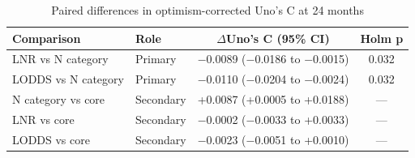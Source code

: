 \begin{table}[htbp]
\caption{Paired differences in optimism-corrected Uno's C at 24 months}\label{tab:paired}
\footnotesize
\begin{tabular*}{\textwidth}{@{\extracolsep{\fill}}llcc@{}}
\toprule
Comparison & Role & $\Delta$Uno's C (95\% CI) & Holm p \\
\midrule
LNR vs N category & Primary & $-$0.0089 ($-$0.0186 to $-$0.0015) & 0.032 \\
LODDS vs N category & Primary & $-$0.0110 ($-$0.0204 to $-$0.0024) & 0.032 \\
N category vs core & Secondary & +0.0087 (+0.0005 to +0.0188) & --- \\
LNR vs core & Secondary & $-$0.0002 ($-$0.0033 to +0.0033) & --- \\
LODDS vs core & Secondary & $-$0.0023 ($-$0.0051 to +0.0010) & --- \\
\bottomrule
\end{tabular*}
\smallskip{}
\end{table}
